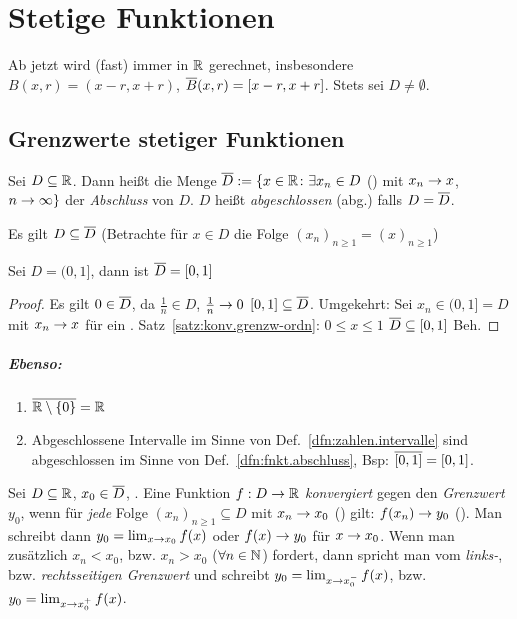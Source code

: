 \documentclass[12pt]{scrreprt}
\begin{document}
\chapter{Stetige Funktionen}
\label{cha:fnkt}
Ab jetzt wird (fast) immer in $\mathbb{R}$ gerechnet, insbesondere $B(x, r) = (x-r, x+r)$, $\overline{B}(x, r) = [x-r, x+r]$.
Stets sei $D \neq \emptyset$.

\section{Grenzwerte stetiger Funktionen}
\label{sec:fnkt.grenzw-stetigk}
\begin{dfn}\label{dfn:fnkt.abschluss}
Sei $D \subseteq \mathbb{R}$. Dann heißt die Menge $\overline{D} := \{x\in\mathbb{R}\colon \exists x_n\in D$ ()
mit $ x_n \rightarrow x$, $n\rightarrow\infty\}$ der \emph{Abschluss} von $D$. $D$ heißt \emph{abgeschlossen} (abg.) falls $D = \overline{D}$.
\end{dfn}

\begin{bem*}
Es gilt $D \subseteq \overline{D}$ (Betrachte für $x\in D$ die Folge $(x_n)_{n\ge 1} = (x)_{n\ge 1}$)
\end{bem*}

\begin{bsp*}
Sei $D = (0, 1]$, dann ist $\overline{D} = [0, 1]$
\end{bsp*}
\begin{proof}
Es gilt $0\in\overline{D}$, da $\frac{1}{n}\in D$, $\frac{1}{n} \rightarrow 0$  \folgt $[0, 1] \subseteq \overline{D}$. 
Umgekehrt: Sei $x_n \in (0, 1] = D$ mit $x_n \rightarrow x$ für ein . Satz~\ref{satz:konv.grenzw-ordn}: $0\le x\le 1$ \folgt $\overline{D} \subseteq [0,1]$ \folgt Beh.
\end{proof}

\paragraph{Ebenso:}
\begin{enumerate}
\item $\overline{\mathbb{R}\setminus\{0\}} = \mathbb{R}$
\item Abgeschlossene Intervalle im Sinne von Def.~\ref{dfn:zahlen.intervalle} sind abgeschlossen im Sinne 
von Def.~\ref{dfn:fnkt.abschluss}, Bsp: $\overline{[0, 1]} = [0, 1]$.
\end{enumerate}

\begin{dfn}\label{dfn:fnkt.grenzw-fnkt}
Sei $D \subseteq \mathbb{R}$, $x_0 \in \overline{D}$, . Eine Funktion $f: D \rightarrow \mathbb{R}$ \emph{konvergiert}
gegen den \emph{Grenzwert} $y_0$, wenn für \emph{jede} Folge $(x_n)_{n \ge 1} \subseteq D$ mit $x_n \rightarrow x_0$ (\ninf) gilt:
$f(x_n) \rightarrow y_0$ (\ninf). Man schreibt dann $y_0 = \lim_{x\rightarrow x_0} f(x)$ oder $f(x) \rightarrow y_0$ für $x \rightarrow x_0$.
Wenn man zusätzlich $x_n < x_0$, bzw. $x_n > x_0$ ($\forall n\in\mathbb{N}$) fordert, dann spricht man vom \emph{links-}, 
bzw. \emph{rechtsseitigen Grenzwert} und schreibt $y_0 = \lim_{x\rightarrow x_0^-} f(x)$, bzw. $y_0 = \lim_{x\rightarrow x_0^+} f(x)$.
\end{dfn}
\end{document}
